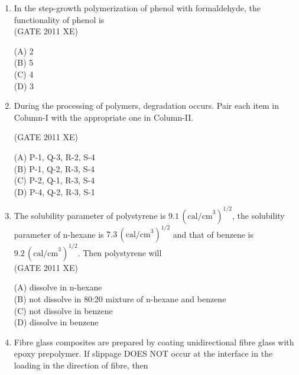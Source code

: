 \documentclass[journal,12pt,onecolumn]{IEEEtran}
\begin{document}
\begin{enumerate}
\begin{enumerate}
\begin{enumerate}[label=\arabic*)]
\item In the step-growth polymerization of phenol with formaldehyde, the functionality of phenol is\\

\hfill{(GATE 2011 XE)} \\
\begin{multicols}{4}
(A) 2\\
(B) 5\\
(C) 4\\
(D) 3
\end{multicols}



\item During the processing of polymers, degradation occurs. Pair each item in Column-I with the appropriate one in Column-II.




\hfill{(GATE 2011 XE)} \\
\begin{multicols}{2}

(A) P-1, Q-3, R-2, S-4\\
(B) P-1, Q-2, R-3, S-4\\
(C) P-2, Q-1, R-3, S-4\\
(D) P-4, Q-2, R-3, S-1
\end{multicols}

\newpage

\item The solubility parameter of polystyrene is $9.1\,(\text{cal/cm}^3)^{1/2}$, the solubility parameter of n-hexane is $7.3\,(\text{cal/cm}^3)^{1/2}$ and that of benzene is $9.2\,(\text{cal/cm}^3)^{1/2}$. Then polystyrene will\\

\hfill{(GATE 2011 XE)} \\
\begin{multicols}{2}
(A) dissolve in n-hexane\\
(B) not dissolve in 80:20 mixture of n-hexane and benzene\\
(C) not dissolve in benzene\\
(D) dissolve in benzene
\end{multicols}

\item Fibre glass composites are prepared by coating unidirectional fibre glass with epoxy prepolymer. If slippage DOES NOT occur at the interface in the loading in the direction of fibre, then\\


\end{enumerate}
\end{enumerate}
\end{enumerate}
\end{document}
